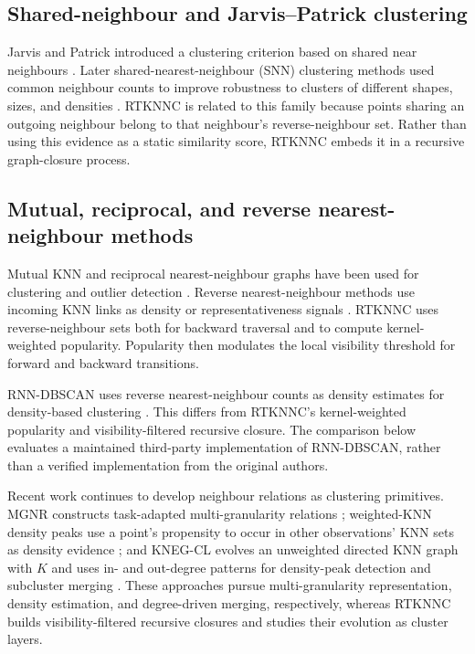 \documentclass[review,12pt]{elsarticle}
\begin{document}
\subsection{Shared-neighbour and Jarvis--Patrick clustering}

Jarvis and Patrick introduced a clustering criterion based on shared near neighbours \citep{JarvisPatrick1973}. Later shared-nearest-neighbour (SNN) clustering methods used common neighbour counts to improve robustness to clusters of different shapes, sizes, and densities \citep{Ertoz2003SNN}. RTKNNC is related to this family because points sharing an outgoing neighbour belong to that neighbour's reverse-neighbour set. Rather than using this evidence as a static similarity score, RTKNNC embeds it in a recursive graph-closure process.

\subsection{Mutual, reciprocal, and reverse nearest-neighbour methods}

Mutual KNN and reciprocal nearest-neighbour graphs have been used for clustering and outlier detection \citep{BritoChavezQuirozYukich1997,GowdaKrishna1978,SardanaBhatnagar2014}. Reverse nearest-neighbour methods use incoming KNN links as density or representativeness signals \citep{ChowdhuryAmorim2018}. RTKNNC uses reverse-neighbour sets both for backward traversal and to compute kernel-weighted popularity. Popularity then modulates the local visibility threshold for forward and backward transitions.

RNN-DBSCAN uses reverse nearest-neighbour counts as density estimates for
density-based clustering \citep{BryantCios2018RNNDBSCAN}. This differs from
RTKNNC's kernel-weighted popularity and visibility-filtered recursive closure.
The comparison below evaluates a maintained third-party implementation of
RNN-DBSCAN, rather than a verified implementation from the original authors.

Recent work continues to develop neighbour relations as clustering primitives.
MGNR constructs task-adapted multi-granularity relations
\citep{XieEtAl2024MGNR}; weighted-KNN density peaks use a point's propensity to
occur in other observations' KNN sets as density evidence
\citep{DingEtAl2024WeightedKNN}; and KNEG-CL evolves an unweighted directed KNN
graph with $K$ and uses in- and out-degree patterns for density-peak detection
and subcluster merging \citep{FeiEtAl2025KNEGCL}. These approaches pursue
multi-granularity representation, density estimation, and degree-driven
merging, respectively, whereas RTKNNC builds visibility-filtered recursive
closures and studies their evolution as cluster layers.
\end{document}
